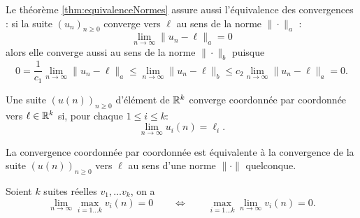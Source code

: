 \remark
Le théorème \ref{thm:equivalenceNormes} assure aussi l'équivalence des convergences : si la suite $(u_n)_{n \geq 0}$ converge vers $\ell$ au sens de la norme $\|\cdot\|_a$ :
$$
\lim_{n \to \infty} \|u_n - \ell\|_a = 0
$$
alors elle converge aussi au sens de la norme $\|\cdot\|_b$ puisque
$$
0 = \frac1{c_1} \lim_{n \to \infty} \|u_n - \ell\|_a
\leq \lim_{n \to \infty} \|u_n - \ell\|_b \leq
c_2 \lim_{n \to \infty} \|u_n - \ell\|_a = 0.
$$

\begin{definition}
  Une suite $(u(n))_{n \geq 0}$ d'élément de $\mathbb{R}^k$ converge coordonnée par coordonnée vers $\ell \in \mathbb{R}^k$ si, pour chaque $1 \leq i \leq k$:
  $$
  \lim_{n \to \infty} u_i(n) = \ell_i.
  $$
\end{definition}

\begin{proposition} \label{prop:convergenceParCoordonnee}
  La convergence coordonnée par coordonnée est équivalente à la convergence de la suite $(u(n))_{n \geq 0}$ vers $\ell$ au sens d'une norme $\|\cdot\|$ quelconque.
\end{proposition}

\begin{lemma} \label{lem:inversionLimiteMaximum}
  Soient $k$ suites réelles $v_1, \dots v_k$, on a
  $$
  \lim_{n \to \infty} \max_{i=1 \dots k} v_i(n) = 0
  \qquad \Leftrightarrow \qquad
  \max_{i=1 \dots k} \lim_{n \to \infty} v_i(n) = 0.
  $$
\end{lemma}

